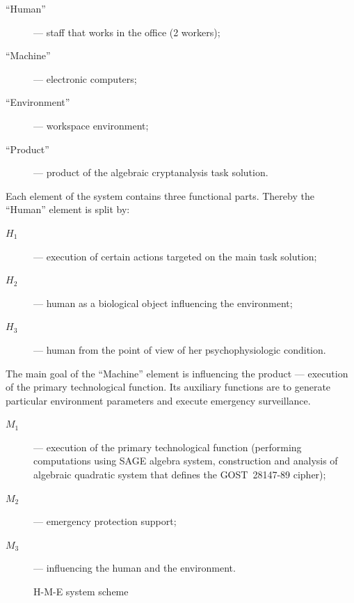 \begin{description}
    \item[``Human''] --- staff that works in the office (2 workers);
    \item[``Machine''] --- electronic computers;
    \item[``Environment''] --- workspace environment;
    \item[``Product''] --- product of the algebraic cryptanalysis task solution.
\end{description}
Each element of the system contains three functional parts. Thereby the
``Human'' element is split by:
\begin{description}
    \item[$H_1$] --- execution of certain actions targeted on the main task solution;
    \item[$H_2$] --- human as a biological object influencing the environment;
    \item[$H_3$] --- human from the point of view of her psychophysiologic condition. 
\end{description}
The main goal of the ``Machine'' element is influencing the product ---
execution of the primary technological function. Its auxiliary functions are to
generate particular environment parameters and execute emergency surveillance.
\begin{description}
    \item[$M_1$] --- execution of the primary technological function
        (performing computations using SAGE algebra system, construction and
        analysis of algebraic quadratic system that defines the GOST~28147-89
        cipher);
    \item[$M_2$] --- emergency protection support;
    \item[$M_3$] --- influencing the human and the environment.
\end{description}

\begin{figure}[htbp]
	\centering
    
	\caption{H-M-E system scheme}
	\label{fig:hme-graph}
\end{figure}

